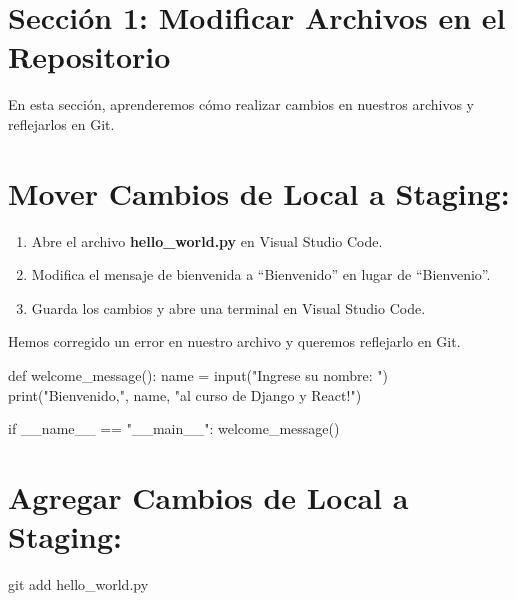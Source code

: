 \documentclass[
  a4paper,
  DIV=11,
  numbers=noendperiod,
  onepage,
  openany]{scrreprt}
\newenvironment{Shaded}{\begin{snugshade}}{\end{snugshade}}
\newcommand{\BuiltInTok}[1]{\textcolor[rgb]{0.00,0.23,0.31}{#1}}
\newcommand{\ControlFlowTok}[1]{\textcolor[rgb]{0.00,0.23,0.31}{#1}}
\newcommand{\ErrorTok}[1]{\textcolor[rgb]{0.68,0.00,0.00}{#1}}
\newcommand{\ExtensionTok}[1]{\textcolor[rgb]{0.00,0.23,0.31}{#1}}
\newcommand{\FunctionTok}[1]{\textcolor[rgb]{0.28,0.35,0.67}{#1}}
\newcommand{\KeywordTok}[1]{\textcolor[rgb]{0.00,0.23,0.31}{#1}}
\newcommand{\NormalTok}[1]{\textcolor[rgb]{0.00,0.23,0.31}{#1}}
\newcommand{\StringTok}[1]{\textcolor[rgb]{0.13,0.47,0.30}{#1}}
\providecommand{\tightlist}{%
  \setlength{\itemsep}{0pt}\setlength{\parskip}{0pt}}\usepackage{longtable,booktabs,array}
\begin{document}
\section{Sección 1: Modificar Archivos en el
Repositorio}\label{secciuxf3n-1-modificar-archivos-en-el-repositorio}

En esta sección, aprenderemos cómo realizar cambios en nuestros archivos
y reflejarlos en Git.

\section{Mover Cambios de Local a
Staging:}\label{mover-cambios-de-local-a-staging}

\begin{enumerate}
\def\labelenumi{\arabic{enumi}.}
\tightlist
\item
  Abre el archivo \textbf{hello\_world.py} en Visual Studio Code.
\item
  Modifica el mensaje de bienvenida a ``Bienvenido'' en lugar de
  ``Bienvenio''.
\item
  Guarda los cambios y abre una terminal en Visual Studio Code.
\end{enumerate}

Hemos corregido un error en nuestro archivo y queremos reflejarlo en
Git.

\begin{Shaded}
\begin{Highlighting}[]
\ExtensionTok{def}\NormalTok{ welcome\_message}\ErrorTok{(}\KeywordTok{)}\BuiltInTok{:}
    \ExtensionTok{name}\NormalTok{ = input}\ErrorTok{(}\StringTok{"Ingrese su nombre: "}\KeywordTok{)}
    \ExtensionTok{print}\ErrorTok{(}\StringTok{"Bienvenido,"}\ExtensionTok{,}\NormalTok{ name, }\StringTok{"al curso de Django y React!"}\KeywordTok{)}

\ControlFlowTok{if} \ExtensionTok{\_\_name\_\_}\NormalTok{ == }\StringTok{"\_\_main\_\_"}\NormalTok{:}
    \FunctionTok{welcome\_message()}
\end{Highlighting}
\end{Shaded}

\section{Agregar Cambios de Local a
Staging:}\label{agregar-cambios-de-local-a-staging}

\begin{Shaded}
\begin{Highlighting}[]
\FunctionTok{git}\NormalTok{ add hello\_world.py}
\end{Highlighting}
\end{Shaded}
\end{document}
